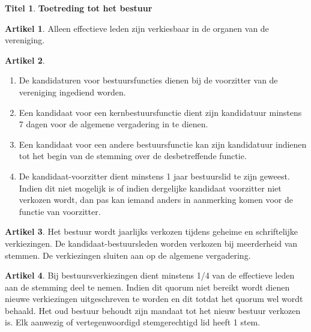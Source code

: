 \documentclass[a4paper,10pt]{article}
\theoremstyle{definition}
\newtheorem{titel}{\newline\Large Titel}
\newtheorem{artikel}{\large Artikel}
\newcommand{\ttext}[1]{\Large \textbf{#1} \normalsize}
\newcommand{\ttextcr}{\hfill\newline}
\newcommand{\ttextenum}{\mbox{}}
\begin{document}
\newpage
\begin{titel}\ttext{Toetreding tot het bestuur}

  \begin{artikel}\ttextcr
    Alleen effectieve leden zijn verkiesbaar in de organen van de vereniging.
  \end{artikel}

  \begin{artikel}\ttextenum
    \begin{enumerate}
      \item
        De kandidaturen voor bestuursfuncties dienen bij de voorzitter van de vereniging ingediend worden.
      \item
        Een kandidaat voor een kernbestuursfunctie dient zijn kandidatuur minstens 7 dagen voor de algemene vergadering in te dienen.
      \item
        Een kandidaat voor een andere bestuursfunctie kan zijn kandidatuur indienen tot het begin van de stemming over de desbetreffende functie.
      \item
        De kandidaat-voorzitter dient minstens 1 jaar bestuurslid te zijn geweest.
        Indien dit niet mogelijk is of indien dergelijke kandidaat voorzitter niet verkozen wordt, dan pas kan iemand anders in aanmerking komen voor de functie van voorzitter.
    \end{enumerate}
  \end{artikel}

  \begin{artikel}\ttextcr
    Het bestuur wordt jaarlijks verkozen tijdens geheime en schriftelijke verkiezingen.
    De kandidaat-bestuursleden worden verkozen bij meerderheid van stemmen.
    De verkiezingen sluiten aan op de algemene vergadering.
  \end{artikel}

  \begin{artikel}\ttextcr
    Bij bestuursverkiezingen dient minstens 1/4 van de effectieve leden aan de stemming deel te nemen.
    Indien dit quorum niet bereikt wordt dienen nieuwe verkiezingen uitgeschreven te worden en dit totdat het quorum wel wordt behaald.
    Het oud bestuur behoudt zijn mandaat tot het nieuw bestuur verkozen is.
    Elk aanwezig of vertegenwoordigd stemgerechtigd lid heeft 1 stem.
  \end{artikel}


\end{titel}
\end{document}

